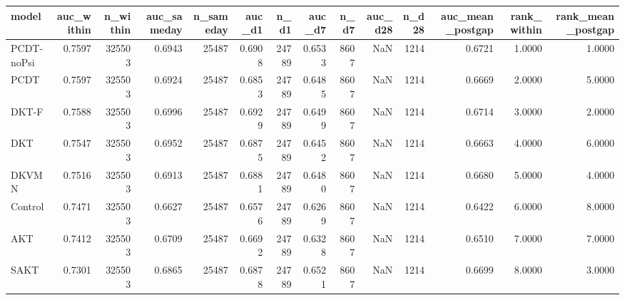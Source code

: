 \begin{tabular}{lrrrrrrrrrrrrr}
\toprule
model & auc\_within & n\_within & auc\_sameday & n\_sameday & auc\_d1 & n\_d1 & auc\_d7 & n\_d7 & auc\_d28 & n\_d28 & auc\_mean\_postgap & rank\_within & rank\_mean\_postgap \\
\midrule
PCDT-noPsi & 0.7597 & 325503 & 0.6943 & 25487 & 0.6908 & 24789 & 0.6533 & 8607 & NaN & 1214 & 0.6721 & 1.0000 & 1.0000 \\
PCDT & 0.7597 & 325503 & 0.6924 & 25487 & 0.6853 & 24789 & 0.6485 & 8607 & NaN & 1214 & 0.6669 & 2.0000 & 5.0000 \\
DKT-F & 0.7588 & 325503 & 0.6996 & 25487 & 0.6929 & 24789 & 0.6499 & 8607 & NaN & 1214 & 0.6714 & 3.0000 & 2.0000 \\
DKT & 0.7547 & 325503 & 0.6952 & 25487 & 0.6875 & 24789 & 0.6452 & 8607 & NaN & 1214 & 0.6663 & 4.0000 & 6.0000 \\
DKVMN & 0.7516 & 325503 & 0.6913 & 25487 & 0.6881 & 24789 & 0.6480 & 8607 & NaN & 1214 & 0.6680 & 5.0000 & 4.0000 \\
Control & 0.7471 & 325503 & 0.6627 & 25487 & 0.6576 & 24789 & 0.6269 & 8607 & NaN & 1214 & 0.6422 & 6.0000 & 8.0000 \\
AKT & 0.7412 & 325503 & 0.6709 & 25487 & 0.6692 & 24789 & 0.6328 & 8607 & NaN & 1214 & 0.6510 & 7.0000 & 7.0000 \\
SAKT & 0.7301 & 325503 & 0.6865 & 25487 & 0.6878 & 24789 & 0.6521 & 8607 & NaN & 1214 & 0.6699 & 8.0000 & 3.0000 \\
\bottomrule
\end{tabular}
